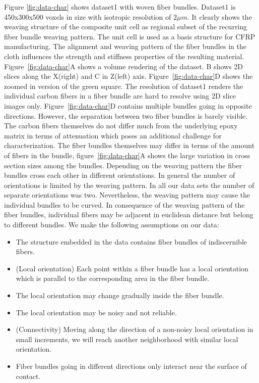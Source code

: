 Figure \ref{fig:data-char} shows dataset1 with woven fiber bundles. Dataset1 is 450x300x500 voxels in size with isotropic resolution of $2\mu m$. It clearly shows the weaving structure of the composite unit cell as regional subset of the recurring fiber bundle weaving pattern. The unit cell is used as a basis structure for CFRP manufacturing. The alignment and weaving pattern of the fiber bundles in the cloth influences the strength and stiffness properties of the resulting material. Figure~\ref{fig:data-char}A shows a volume rendering of the dataset. B shows 2D slices along the X(right) and C in Z(left) axis. Figure~\ref{fig:data-char}D shows the zoomed in version of the green square. 
The resolution of dataset1 renders the individual carbon fibers in a fiber bundle are hard to resolve using 2D slice images only. Figure~\ref{fig:data-char}D contains multiple bundles going in opposite directions. However, the separation between two fiber bundles is barely visible. The carbon fibers themselves do not differ much from the underlying epoxy matrix in terms of attenuation which poses an additional challenge for characterization. The fiber bundles themselves may differ in terms of the amount of fibers in the bundle, figure~\ref{fig:data-char}A shows the large variation in cross section sizes among the bundles.
Depending on the weaving pattern the fiber bundles cross each other in different orientations. In general the number of orientations is limited by the weaving pattern. In all our data sets the number of separate orientations was two. Nevertheless, the weaving pattern may cause the individual bundles to be curved. In consequence of the weaving pattern of the fiber bundles, individual fibers may be adjacent in euclidean distance but belong to different bundles. 
We make the following assumptions on our data:
\begin{itemize}
\item The structure embedded in the data contains fiber bundles of indiscernible fibers.
\item (Local orientation) Each point within a fiber bundle has a local orientation which is parallel to the corresponding area in the fiber bundle.
\item The local orientation may change gradually inside the fiber bundle.
\item The local orientation may be noisy and not reliable.
\item (Connectivity) Moving along the direction of a non-noisy local orientation in small increments, we will reach another neighborhood with similar local orientation.
\item Fiber bundles going in different directions only interact near the surface of contact.
\end{itemize}
